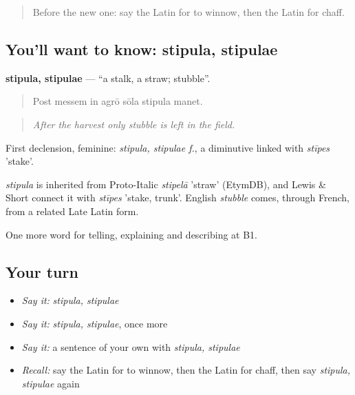 \label{lesson:LA-C476-stipula}



\begin{quote}
Before the new one: say the Latin for to winnow, then the Latin for chaff.
\end{quote}

\subsection*{You'll want to know: stipula, stipulae}
\textbf{stipula, stipulae} — \textquotedblleft{}a stalk, a straw; stubble\textquotedblright{}.

\begin{quote}
Post messem in agrō sōla stipula manet.
\end{quote}

\begin{quote}
\emph{After the harvest only stubble is left in the field.}
\end{quote}

First declension, feminine: \emph{stipula, stipulae f.}, a diminutive linked with \emph{stīpes} 'stake'.

\begin{cousinweb}
\emph{stipula} is inherited from Proto-Italic \emph{stipelā} 'straw' (EtymDB), and Lewis \& Short connect it with \emph{stīpes} 'stake, trunk'. English \emph{stubble} comes, through French, from a related Late Latin form.
\end{cousinweb}

\begin{grammarlens}[title={What you've built}]
One more word for telling, explaining and describing at B1.
\end{grammarlens}

\subsection*{Your turn}
\begin{itemize}
\raggedright
  \item \emph{Say it:} \emph{stipula, stipulae}
  \item \emph{Say it:} \emph{stipula, stipulae}, once more
  \item \emph{Say it:} a sentence of your own with \emph{stipula, stipulae}
  \item \emph{Recall:} say the Latin for to winnow, then the Latin for chaff, then say \emph{stipula, stipulae} again
\end{itemize}

